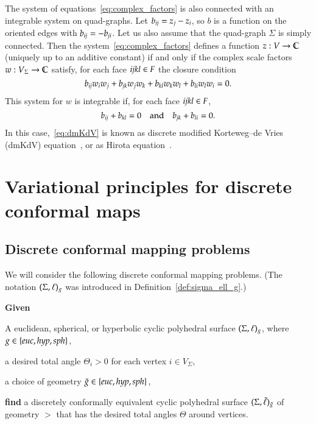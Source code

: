\documentclass[Thesis]{subfiles}
\begin{document}
\begin{remark}
  The system of equations~\eqref{eq:complex_factors} is also connected
  with an integrable system on quad-graphs. Let $b_{\it
    ij}=z_{j}-z_{i}$, so $b$ is a function on the oriented edges with
  $b_{\it ij}=-b_{\it ji}$. Let us also assume that the quad-graph
  $\Sigma$ is simply connected. Then the
  system~\eqref{eq:complex_factors} defines a function
  $z:V\rightarrow\mathbb C$ (uniquely up to an additive constant) if and only
  if the complex scale factors $w:V_{\Sigma}\rightarrow \mathbb C$ satisfy,
  for each face ${\it ijkl}\in F$ the closure condition
  \begin{equation}
    \label{eq:dmKdV}
    b_{\it ij}w_{i}w_{j}+b_{\it jk}w_{j}w_{k}+b_{\it kl}w_{k}w_{l}+b_{\it li}w_{l}w_{i}=0.
  \end{equation}
  This system for $w$ is integrable if, for each face ${\it ijkl}\in
  F$,
  \begin{equation*}
    b_{\it ij}+b_{\it kl}=0 \quad\text{and}\quad b_{\it jk}+b_{\it
      li}=0.
  \end{equation*}
  In this case,~\eqref{eq:dmKdV} is known as discrete modified
  Korteweg--de Vries (dmKdV) equation~\cite{NijhoffCapel1995}, or as
  Hirota equation~\cite{Bobenko-Suris2002, BobenkoSuris2008}.
\end{remark}



\section{Variational principles for discrete conformal maps}
\label{sec:vari-princ}

\subsection{Discrete conformal mapping problems}

We will consider the following discrete conformal mapping
problems. (The notation $(\Sigma,\ell)_{g}$ was introduced in
Definition~\ref{def:sigma_ell_g}.)

\begin{problem}
\label{prob:total_angles}
\textbf{Given}
\begin{compactitem}[$\bullet$]
\item A euclidean, spherical, or hyperbolic cyclic polyhedral surface
  $(\Sigma,\ell)_{g}$, where $\g\in\{\euc, \hyp, \sph\}$,
\item a desired total angle $\Theta_{i}>0$ for each vertex $i\in V_{\Sigma}$,
\item a choice of geometry $\gt\in\{\euc, \hyp, \sph\}$,
\end{compactitem}
\noindent%
\textbf{find} %
a discretely conformally equivalent cyclic polyhedral surface
$(\Sigma,\tilde{\ell})_{\tilde{g}}$ of geometry $\gt$ that has the
desired total angles $\Theta$ around vertices.
\end{problem}
\end{document}
